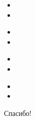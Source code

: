 \documentclass{beamer}
\begin{document}
\begin{frame}{}
\begin{itemize}
  \item 
  \item 
\end{itemize}
\end{frame}

\begin{frame}{}
\begin{itemize}
  \item 
  \item 
\end{itemize}
\end{frame}

\begin{frame}{}
\begin{itemize}
  \item 
  \item 
\end{itemize}
\end{frame}

\begin{frame}{}
\begin{itemize}
  \item 
  \item 
\end{itemize}
\end{frame}


\begin{frame}{}
    \thispagestyle{empty}
    \begin{center}
        {\large Спасибо!}
    \end{center}
\end{frame}


\end{document}
